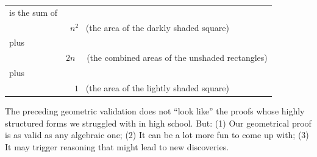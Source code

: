 \begin{tabular}{ll}
is the sum of & \\
  & \ $n^2$ \ (the area of the darkly shaded square) \\
plus & \\
  & $2n$ \ \ (the combined areas of the unshaded rectangles) \\
plus & \\
  & \ \ $1$ \ (the area of the lightly shaded square)
\end{tabular}

\medskip

\noindent
The preceding geometric validation does not ``look like'' the proofs whose highly structured forms we struggled with in high school.  But: (1) Our geometrical proof is as valid as any algebraic one; (2) It can be a lot more fun to come up with; (3) It may trigger reasoning that might lead to new discoveries.

\bigskip


